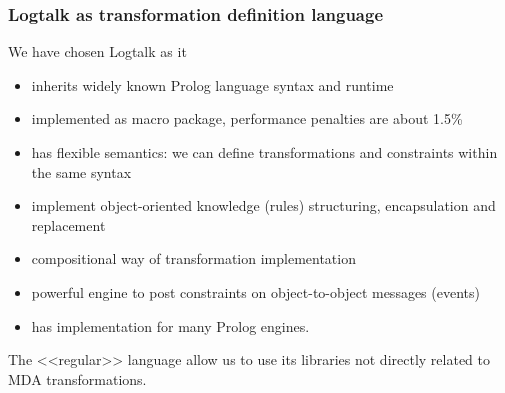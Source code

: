 \documentclass[10pt]{beamer}
\begin{document}
\begin{frame}
  \frametitle{Logtalk as transformation definition language}
  We have chosen Logtalk as it
  \begin{itemize}
  \item inherits widely known Prolog language syntax and runtime
  \item implemented as macro package, performance penalties are about 1.5\%
  \item has flexible semantics: we can define transformations and constraints within the same syntax
  \item implement object-oriented knowledge (rules) structuring, encapsulation and replacement
  \item compositional way of transformation implementation
  \item powerful engine to post constraints on object-to-object messages (events)
  \item has implementation for many Prolog engines.
  \end{itemize}
  The <<regular>> language allow us to use its libraries not directly related to MDA transformations.
\end{frame}
\end{document}
